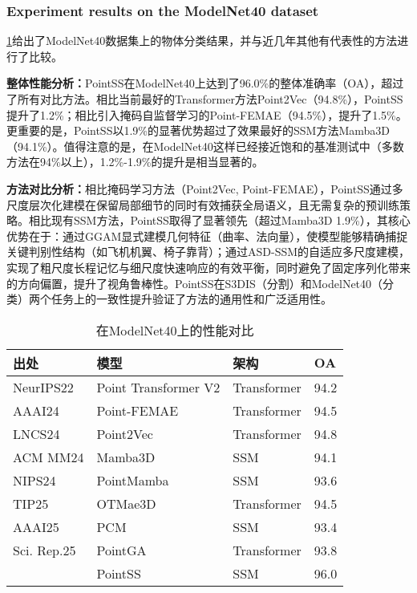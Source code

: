 \documentclass[preprint,12pt]{elsarticle}
\begin{document}
\subsubsection{Experiment results on the ModelNet40 dataset}

\cref{tab:ModelNet}给出了ModelNet40数据集上的物体分类结果，并与近几年其他有代表性的方法进行了比较。

\textbf{整体性能分析：}PointSS在ModelNet40上达到了96.0\%的整体准确率（OA），超过了所有对比方法。相比当前最好的Transformer方法Point2Vec（94.8\%），PointSS提升了1.2\%；相比引入掩码自监督学习的Point-FEMAE（94.5\%），提升了1.5\%。更重要的是，PointSS以1.9\%的显著优势超过了效果最好的SSM方法Mamba3D（94.1\%）。值得注意的是，在ModelNet40这样已经接近饱和的基准测试中（多数方法在94\%以上），1.2\%-1.9\%的提升是相当显著的。

\textbf{方法对比分析：}相比掩码学习方法（Point2Vec, Point-FEMAE），PointSS通过多尺度层次化建模在保留局部细节的同时有效捕获全局语义，且无需复杂的预训练策略。相比现有SSM方法，PointSS取得了显著领先（超过Mamba3D 1.9\%），其核心优势在于：通过GGAM显式建模几何特征（曲率、法向量），使模型能够精确捕捉关键判别性结构（如飞机机翼、椅子靠背）；通过ASD-SSM的自适应多尺度建模，实现了粗尺度长程记忆与细尺度快速响应的有效平衡，同时避免了固定序列化带来的方向偏置，提升了视角鲁棒性。PointSS在S3DIS（分割）和ModelNet40（分类）两个任务上的一致性提升验证了方法的通用性和广泛适用性。

\begin{table}[htbp!]
	\centering
	\caption{在ModelNet40上的性能对比}
	\label{tab:ModelNet}
	\begin{tabular}{@{}llll@{}}
		\toprule
		\textbf{出处}  & \textbf{模型}           & \textbf{架构} & \textbf{OA} \\ \midrule
		NeurIPS22 & Point Transformer V2\cite{ptv2}  & Transformer & 94.2          \\
		AAAI24    & Point-FEMAE\cite{FEMAE}        & Transformer & 94.5             \\
		LNCS24      & Point2Vec\cite{Point2Vec}      & Transformer & 94.8          \\
		ACM MM24     & Mamba3D\cite{Mamba3D}              & SSM & 94.1          \\
		NIPS24    & PointMamba\cite{PointMamba}   & SSM         & 93.6         \\
		TIP25     & OTMae3D\cite{OTMae3D}    & Transformer & 94.5          \\
		AAAI25    & PCM\cite{pcm}     & SSM         & 93.4         \\
		Sci. Rep.25 & PointGA\cite{pointga}           & Transformer & 93.8         \\
		& PointSS               &SSM             & 96.0          \\ \bottomrule
	\end{tabular}
\end{table}
\end{document}
